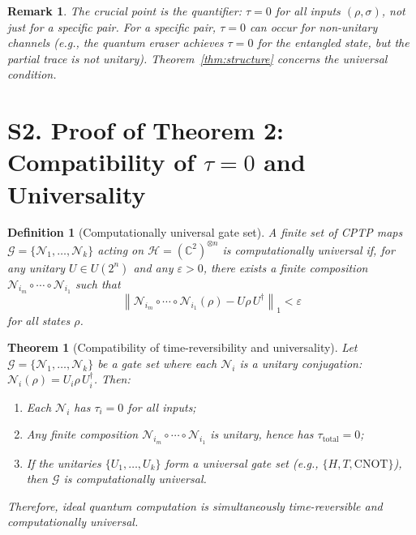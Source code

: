 \documentclass[prl,twocolumn,superscriptaddress,longbibliography]{revtex4-2}
\newtheorem{theorem}{Theorem}
\newtheorem*{definition}{Definition}
\newtheorem*{remark}{Remark}
\newcommand{\chan}{\mathcal{N}}
\newcommand{\hilb}{\mathcal{H}}
\newcommand{\norm}[1]{\left\|#1\right\|}
\newcommand{\tauasym}{\tau}
\begin{document}
\begin{remark}
The crucial point is the quantifier: $\tauasym = 0$ for
\emph{all} inputs $(\rho, \sigma)$, not just for a specific pair.
For a specific pair, $\tauasym = 0$ can occur for non-unitary channels
(e.g., the quantum eraser achieves $\tauasym = 0$ for the entangled
state, but the partial trace is not unitary).  Theorem~\ref{thm:structure}
concerns the universal condition.
\end{remark}

\section{S2. Proof of Theorem 2: Compatibility of \texorpdfstring{$\tauasym = 0$}{tau=0} and Universality}
\label{sec:thm2}

\begin{definition}[Computationally universal gate set]
A finite set of CPTP maps
$\mathcal{G} = \{\chan_1, \ldots, \chan_k\}$ acting on
$\hilb = (\mathbb{C}^2)^{\otimes n}$ is \emph{computationally universal}
if, for any unitary $U \in U(2^n)$ and any $\varepsilon > 0$,
there exists a finite composition
$\chan_{i_m} \circ \cdots \circ \chan_{i_1}$
such that
\begin{equation}
\norm{\chan_{i_m} \circ \cdots \circ \chan_{i_1}(\rho)
- U\rho\, U^\dagger}_1 < \varepsilon
\end{equation}
for all states $\rho$.
\end{definition}

\begin{theorem}[Compatibility of time-reversibility and universality]
\label{thm:compatibility}
Let $\mathcal{G} = \{\chan_1, \ldots, \chan_k\}$ be a gate set where
each $\chan_i$ is a unitary conjugation:
$\chan_i(\rho) = U_i \rho\, U_i^\dagger$.  Then:
\begin{enumerate}
\item[\emph{(a)}] Each $\chan_i$ has $\tauasym_i = 0$ for all inputs;
\item[\emph{(b)}] Any finite composition
  $\chan_{i_m} \circ \cdots \circ \chan_{i_1}$ is unitary, hence has
  $\tauasym_{\mathrm{total}} = 0$;
\item[\emph{(c)}] If the unitaries $\{U_1, \ldots, U_k\}$ form a universal
  gate set (e.g., $\{H, T, \mathrm{CNOT}\}$), then $\mathcal{G}$
  is computationally universal.
\end{enumerate}
Therefore, ideal quantum computation is simultaneously time-reversible
and computationally universal.
\end{theorem}
\end{document}
